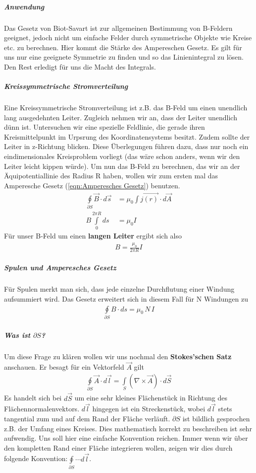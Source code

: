 \subparagraph{Anwendung} Das Gesetz von Biot-Savart ist zur allgemeinen Bestimmung von B-Feldern geeignet, jedoch nicht um einfache Felder durch symmetrische Objekte wie Kreise etc. zu berechnen. Hier kommt die Stärke des Ampereschen Gesetz. Es gilt für uns nur eine geeignete Symmetrie zu finden und so das Linienintegral zu lösen. Den Rest erledigt für uns die Macht des Integrals. 
\subparagraph{Kreissymmetrische Stromverteilung} Eine Kreissymmetrische Stromverteilung ist z.B. das B-Feld um einen unendlich lang ausgedehnten Leiter. Zugleich nehmen wir an, dass der Leiter unendlich dünn ist.
Untersuchen wir eine spezielle Feldlinie, die gerade ihren Kreismittelpunkt im Urpsrung des Koordinatensystems besitzt. Zudem sollte der Leiter in z-Richtung blicken.
Diese Überlegungen führen dazu, dass nur noch ein eindimensionales Kreisproblem vorliegt (das wäre schon anders, wenn wir den Leiter leicht kippen würde).
Um nun das B-Feld zu berechnen, das wir an der Äquipotentiallinie des Radius R haben, wollen wir zum ersten mal das Amperesche Gesetz (\ref{eqn:Amperesches Gesetz}) benutzen.
\begin{align*}
\oint \limits_{\partial S} \vec{B} \cdot d\vec{s} &= \mu_0 \int \limits \vec{j\left( r \right)} \cdot d\vec{A} \\
B \int \limits_{0}^{2\pi R}  ds &= \mu_0 I
\end{align*} Für unser B-Feld um einen \textbf{langen Leiter} ergibt sich also
\begin{align*}
B = \frac{\mu_0}{2\pi R} I
\end{align*}

\subparagraph{Spulen und Amperesches Gesetz} Für Spulen merkt man sich, dass jede einzelne Durchflutung einer Windung aufsummiert wird. Das Gesetz erweitert sich in diesem Fall für N Windungen zu
\begin{align} \label{eqn:Amperesches Gesetz für Spulen}
\oint \limits_{\partial S} B \cdot ds = \mu_0 \, N \, I 
\end{align}


\subparagraph{Was ist $\partial S$?} Um diese Frage zu klären wollen wir uns nochmal den \textbf{Stokes'schen Satz} anschauen. Er besagt für ein Vektorfeld $\vec{A}$ gilt
\begin{align} \label{eqn:Stokes}
\oint \limits_{\partial S} \vec{A} \cdot d\vec{l} = \int \limits_S \left(\nabla \times \vec{A} \right) \cdot d\vec{S}
\end{align} Es handelt sich bei $d\vec{S}$ um eine sehr kleines Flächenstück in Richtung des Flächennormalenvektors. $d\vec{l}$ hingegen ist ein Streckenstück, wobei $d\vec{l}$ stets tangential zum und auf dem Rand der Fläche verläuft. $\partial S$ ist bildlich gesprochen z.B. der Umfang eines Kreises. Dies mathematisch korrekt zu beschreiben ist sehr aufwendig. Uns soll hier eine einfache Konvention reichen. Immer wenn wir über den kompletten Rand einer Fläche integrieren wollen, zeigen wir dies durch folgende Konvention:$\oint \limits_{\partial S} \cdots d\vec{l}$.

